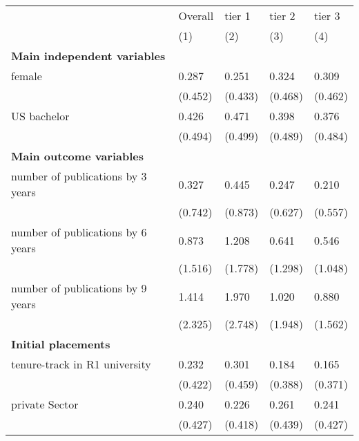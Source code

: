 \begin{table}[ht]
	\centering
	\begin{adjustbox}{max width=0.75\textwidth}
		\begin{tabular}{lllll}
			\hline\hline
			& Overall & tier 1 & tier 2 & tier 3 \\ 
			& (1)  & (2)  & (3) & (4) \\
			\hline
			\textbf{Main independent variables} &         &        &        &        \\
			female                              & 0.287  & 0.251  & 0.324 & 0.309   \\
			& (0.452)  & (0.433) & (0.468) & (0.462) \\
			US bachelor                         & 0.426  & 0.471 & 0.398 & 0.376 \\
			& (0.494)  & (0.499) & (0.489) & (0.484) \\
			\textbf{Main outcome variables}     &         &        &        &        \\
			number of publications by 3 years &  0.327 & 0.445 & 0.247 & 0.210\\
			&  (0.742) & (0.873) & (0.627) & (0.557) \\
			number of publications by 6 years &  0.873 & 1.208& 0.641 & 0.546\\
			&   (1.516) & (1.778) & (1.298) & (1.048) \\
			number of publications by 9 years &  1.414 & 1.970 &  1.020 & 0.880 \\
			&  (2.325) & (2.748) & (1.948) & (1.562) \\
			\textbf{Initial placements}     &         &        &        &        \\
			tenure-track in R1 university                           & 0.232  & 0.301 & 0.184 & 0.165 \\
			& (0.422)  & (0.459) & (0.388) & (0.371) \\
			private Sector                      & 0.240  & 0.226 & 0.261 & 0.241 \\
			& (0.427)    & (0.418) & (0.439) & (0.427) \\ 
			

\end{tabular}
\end{adjustbox}
\end{table}
